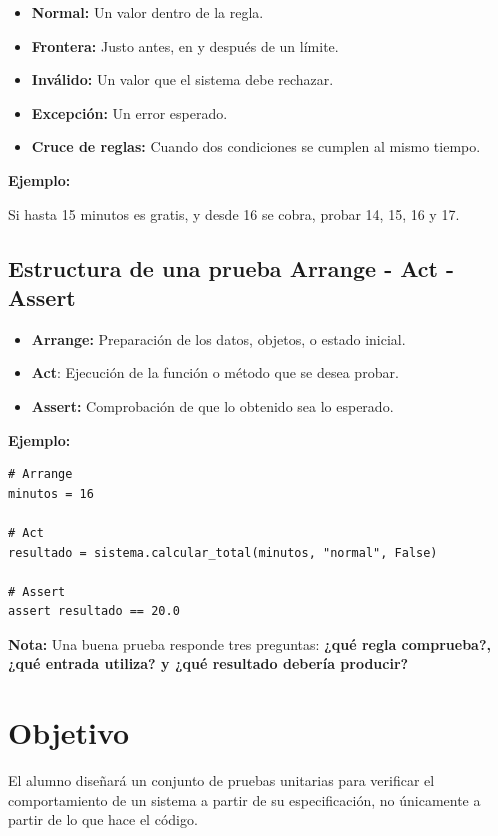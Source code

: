 \documentclass[11pt,letterpaper]{article}
\begin{document}
\begin{itemize}
\item \textbf{Normal:} Un valor dentro de la regla.
\item \textbf{Frontera:} Justo antes, en y después de un límite.
\item \textbf{Inválido:} Un valor que el sistema debe rechazar.
\item \textbf{Excepción:} Un error esperado.
\item \textbf{Cruce de reglas:} Cuando dos condiciones se cumplen al mismo tiempo.
\end{itemize}

\textbf{Ejemplo:}

Si hasta 15 minutos es gratis, y desde 16 se cobra, probar 14, 15, 16 y 17.


\subsection{Estructura de una prueba Arrange - Act - Assert}
\label{sec:org706b3ca}

\begin{itemize}
\item \textbf{Arrange:} Preparación de los datos, objetos, o estado inicial.
\item \textbf{Act}: Ejecución de la función o método que se desea probar.
\item \textbf{Assert:} Comprobación de que lo obtenido sea lo esperado.
\end{itemize}

\textbf{Ejemplo:}


\begin{lstlisting}[style=practica]
# Arrange
minutos = 16

# Act
resultado = sistema.calcular_total(minutos, "normal", False)

# Assert
assert resultado == 20.0
\end{lstlisting}

\textbf{Nota:} Una buena prueba responde tres preguntas: \textbf{¿qué regla comprueba?, ¿qué entrada utiliza? y ¿qué resultado debería producir?}


\section{Objetivo}
\label{sec:org5849288}

El alumno diseñará un conjunto de pruebas unitarias para verificar el comportamiento de un sistema a partir de su especificación, no únicamente a partir de lo que hace el código.
\end{document}
